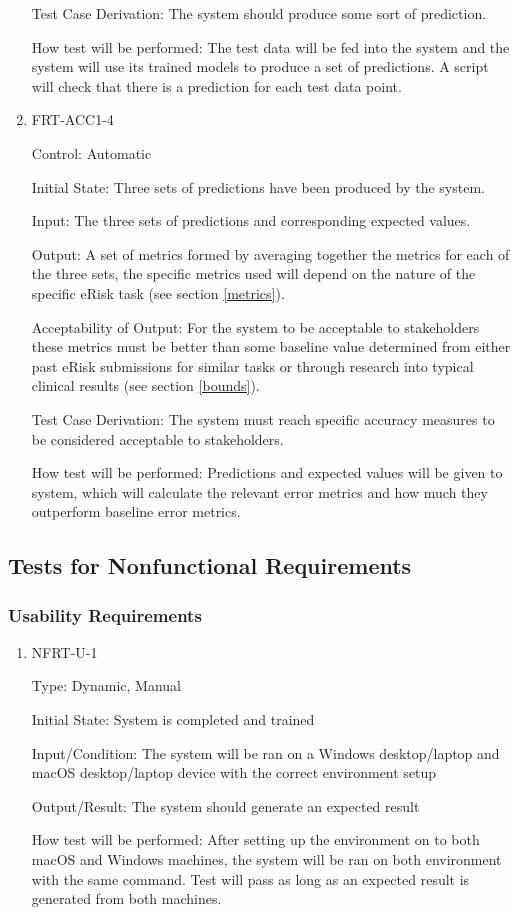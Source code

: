 \documentclass[12pt, titlepage]{article}
\begin{document}
\begin{enumerate}
Test Case Derivation: The system should produce some sort of prediction.

How test will be performed: The test data will be fed into the system and the system will use its trained models to produce a set of predictions. A script will check that there is a prediction for each test data point.

\item{FRT-ACC1-4\\}

Control: Automatic

Initial State: Three sets of predictions have been produced by the system.

Input: The three sets of predictions and corresponding expected values.

Output: A set of metrics formed by averaging together the metrics for each of the three sets, the specific metrics used will depend on the nature of the specific eRisk task (see section \ref{metrics}).

Acceptability of Output: For the system to be acceptable to stakeholders these metrics must be better than some baseline value determined from either past eRisk submissions for similar tasks or through research into typical clinical results (see section \ref{bounds}).

Test Case Derivation: The system must reach specific accuracy measures to be considered acceptable to stakeholders.

How test will be performed: Predictions and expected values will be given to system, which will calculate the relevant error metrics and how much they outperform baseline error metrics.

\end{enumerate}

\subsection{Tests for Nonfunctional Requirements}
\subsubsection{Usability Requirements}
		

\begin{enumerate}

\item{NFRT-U-1\\}

Type: Dynamic, Manual
					
Initial State: System is completed and trained
					
Input/Condition: The system will be ran on a Windows desktop/laptop and macOS desktop/laptop device with the correct environment setup
					
Output/Result: The system should generate an expected result 
					
How test will be performed: After setting up the environment on to both macOS and Windows machines, the system will be ran on both environment with the same command. Test will pass as long as an expected result is generated from both machines.


\end{enumerate}
\end{document}
